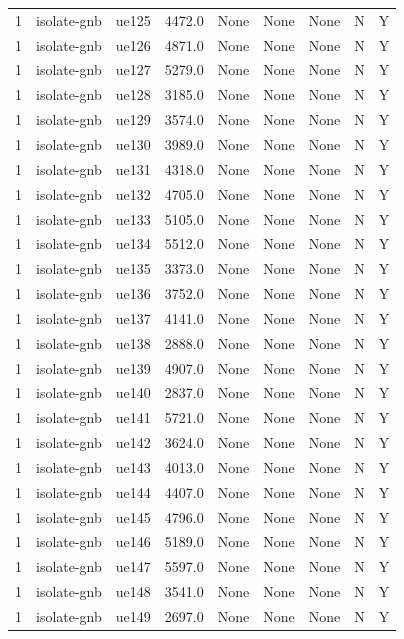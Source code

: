 \begin{table}[ht]
\begin{tabular}{|c|c|c|c|c|c|c|c|c|}
1 & isolate-gnb & ue125 & 4472.0 & None & None & None & N & Y \\
1 & isolate-gnb & ue126 & 4871.0 & None & None & None & N & Y \\
1 & isolate-gnb & ue127 & 5279.0 & None & None & None & N & Y \\
1 & isolate-gnb & ue128 & 3185.0 & None & None & None & N & Y \\
1 & isolate-gnb & ue129 & 3574.0 & None & None & None & N & Y \\
1 & isolate-gnb & ue130 & 3989.0 & None & None & None & N & Y \\
1 & isolate-gnb & ue131 & 4318.0 & None & None & None & N & Y \\
1 & isolate-gnb & ue132 & 4705.0 & None & None & None & N & Y \\
1 & isolate-gnb & ue133 & 5105.0 & None & None & None & N & Y \\
1 & isolate-gnb & ue134 & 5512.0 & None & None & None & N & Y \\
1 & isolate-gnb & ue135 & 3373.0 & None & None & None & N & Y \\
1 & isolate-gnb & ue136 & 3752.0 & None & None & None & N & Y \\
1 & isolate-gnb & ue137 & 4141.0 & None & None & None & N & Y \\
1 & isolate-gnb & ue138 & 2888.0 & None & None & None & N & Y \\
1 & isolate-gnb & ue139 & 4907.0 & None & None & None & N & Y \\
1 & isolate-gnb & ue140 & 2837.0 & None & None & None & N & Y \\
1 & isolate-gnb & ue141 & 5721.0 & None & None & None & N & Y \\
1 & isolate-gnb & ue142 & 3624.0 & None & None & None & N & Y \\
1 & isolate-gnb & ue143 & 4013.0 & None & None & None & N & Y \\
1 & isolate-gnb & ue144 & 4407.0 & None & None & None & N & Y \\
1 & isolate-gnb & ue145 & 4796.0 & None & None & None & N & Y \\
1 & isolate-gnb & ue146 & 5189.0 & None & None & None & N & Y \\
1 & isolate-gnb & ue147 & 5597.0 & None & None & None & N & Y \\
1 & isolate-gnb & ue148 & 3541.0 & None & None & None & N & Y \\
1 & isolate-gnb & ue149 & 2697.0 & None & None & None & N & Y \\

\end{tabular}
\end{table}
